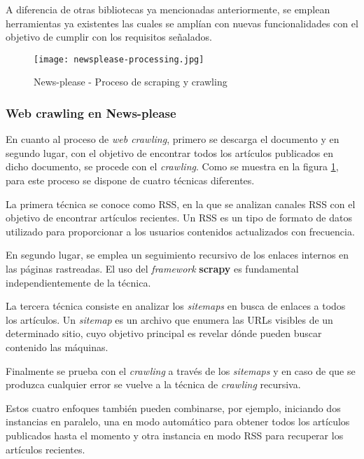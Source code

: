 A diferencia de otras bibliotecas ya mencionadas anteriormente, se emplean herramientas ya existentes las 
cuales se amplían con nuevas funcionalidades con el objetivo de cumplir con los requisitos señalados.

\begin{figure}[tphb]
  \centering
  \texttt{[image: newsplease-processing.jpg]}
  \caption{News-please - Proceso de scraping y crawling}
  \label{img:news-please - proceso de scraping y crawling}
\end{figure}

\subsubsection{Web crawling en News-please}
\label{subsubsec:web crawling en news-please}

En cuanto al proceso de \emph{web crawling}, primero se descarga el documento y en segundo lugar, con el 
objetivo de encontrar todos los artículos publicados en dicho documento, se procede con el \emph{crawling}. 
Como se muestra en la figura \ref{img:news-please - proceso de scraping y crawling}, para este proceso se 
dispone de cuatro técnicas diferentes.

La primera técnica se conoce como RSS, en la que se analizan canales RSS con el objetivo de encontrar 
artículos recientes. Un RSS \cite{rss-sitemaps} es un tipo de formato de datos utilizado para proporcionar 
a los usuarios contenidos actualizados con frecuencia.

En segundo lugar, se emplea un seguimiento recursivo de los enlaces internos en las páginas rastreadas.
El uso del \emph{framework} \textbf{scrapy} es fundamental independientemente de la técnica.

La tercera técnica consiste en analizar los \emph{sitemaps} en busca de enlaces a todos los artículos. Un 
\emph{sitemap} \cite{rss-sitemaps} es un archivo que enumera las URLs visibles de un determinado sitio, 
cuyo objetivo principal es revelar dónde pueden buscar contenido las máquinas.

Finalmente se prueba con el \emph{crawling} a través de los \emph{sitemaps} y en caso de que se produzca 
cualquier error se vuelve a la técnica de \emph{crawling} recursiva.

Estos cuatro enfoques también pueden combinarse, por ejemplo, iniciando dos instancias en paralelo, una en 
modo automático para obtener todos los artículos publicados hasta el momento y otra instancia en modo RSS 
para recuperar los artículos recientes.

